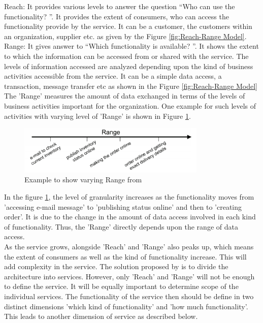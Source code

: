 Reach: It provides various levels to answer the question “Who can use the functionality? ”.  It provides the extent of consumers, who can access the functionality provide  by the service. It can be a customer, the customers within an organization, supplier etc. as given by the Figure \ref{fig:Reach-Range Model}.
\\
Range: It gives answer to “Which functionality is available? ”. It shows the extent to which the information can be accessed from or shared with the service. The levels of information accessed are analyzed depending upon the kind of business activities accessible from the service. It can be a simple data access, a transaction, message transfer etc as shown in the Figure \ref{fig:Reach-Range Model} The 'Range' measures the amount of data exchanged in terms of the levels of business activities important for the organization. One example for such levels of activities with varying level of 'Range' is shown in Figure \ref{fig:Range Example}.
\begin{figure}[H]
\begin{center}
\includegraphics[width=0.8\textwidth]{figures/Granularity-R3-two}
\caption{Example to show varying Range from \cite{Keen:2015aa, Weill:1998aa}}
\label{fig:Range Example}
\end{center}
\end{figure}
In the figure \ref{fig:Range Example}, the level of granularity increases as the functionality moves from 'accessing e-mail message' to 'publishing status online' and then to 'creating order'. It is due to the change in the amount of data access involved in each kind of functionality. Thus, the 'Range' directly depends upon the range of data access.
\\
As the service grows,  alongside 'Reach' and 'Range' also peaks up, which means the extent of consumers as well as the kind of functionality increase. This will add complexity in the service. The solution proposed by \cite{Cockburn:2001aa} is to divide the architecture into services. However, only 'Reach' and 'Range' will not be enough to define the service. It will be equally important to determine scope of the individual services. The functionality of the service then should be define in two distinct dimensions 'which kind of functionality' and 'how much functionality'. This leads to another dimension of service as described below.

